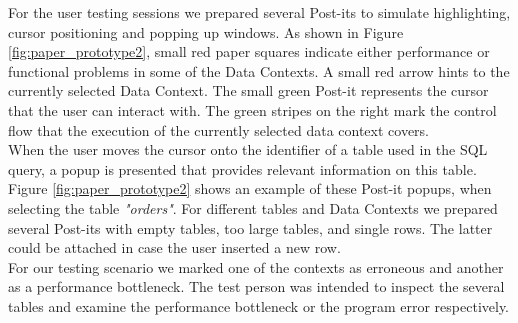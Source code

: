 For the user testing sessions we prepared several Post-its to simulate highlighting, cursor positioning and popping up windows. 
As shown in Figure \ref{fig:paper_prototype2}, small red paper squares indicate either performance or functional problems in some of the Data Contexts. 
A small red arrow hints to the currently selected Data Context. The small green Post-it represents the cursor that the user can interact with. 
The green stripes on the right mark the control flow that the execution of the currently selected data context covers. \\

When the user moves the cursor onto the identifier of a table used in the SQL query, a popup is presented that provides relevant information on this table.
Figure \ref{fig:paper_prototype2} shows an example of these Post-it popups, when selecting the table \emph{"orders"}. 
For different tables and Data Contexts we prepared several Post-its with empty tables, too large tables, and single rows. The latter could be attached in case the user inserted a new row.\\

For our testing scenario we marked one of the contexts as erroneous and another as a performance bottleneck. 
The test person was intended to inspect the several tables and examine the performance bottleneck or the program error respectively.







